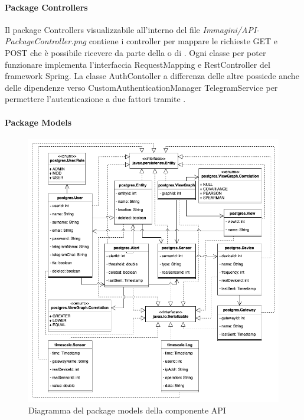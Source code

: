		\paragraph{Package Controllers}
		Il package Controllers visualizzabile all'interno del file \textit{Immagini/API-PackageController.png} contiene i controller per mappare le richieste GET e POST che è possibile ricevere da parte della  o di .
		\newline
		Ogni classe per poter funzionare implementa l'interfaccia RequestMapping e RestController del framework Spring.
		\newline
		La classe AuthContoller a differenza delle altre possiede anche delle dipendenze verso CustomAuthenticationManager TelegramService per permettere l'autenticazione a due fattori tramite .
		\paragraph*{Package Models}
		\begin{figure}[H]
			\centering
			\includegraphics[scale=0.550]{res/images/API/ModelsPackage.png}
			\caption{Diagramma del package models della componente API}
			\label{Diagramma 14}
		\end{figure}
